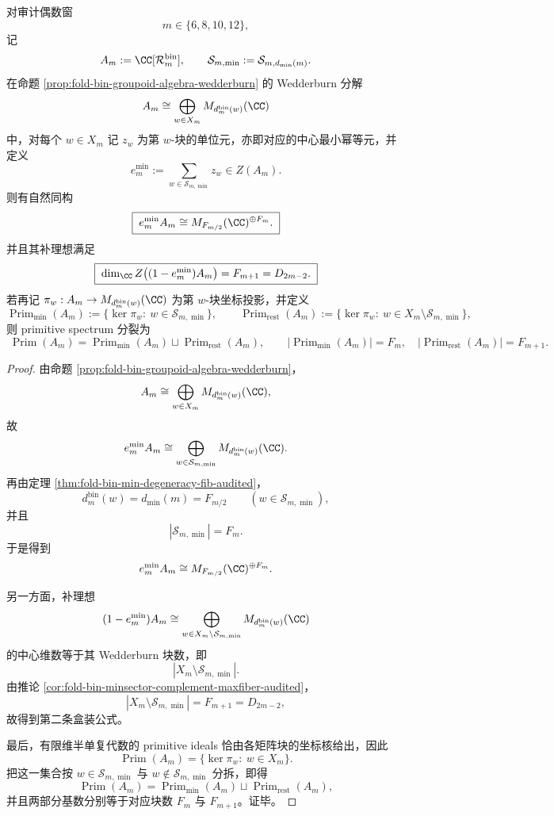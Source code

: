 \begin{theorem}\label{thm:conclusion-foldbin-minideal-fibonacci-primitive-splitting}
对审计偶数窗
\[
m\in\{6,8,10,12\},
\]
记
\[
A_m:=\CC[\mathcal R_m^{\mathrm{bin}}],
\qquad
\mathcal S_{m,\min}:=\mathcal S_{m,d_{\min}(m)}.
\]
在命题 \ref{prop:fold-bin-groupoid-algebra-wedderburn} 的 Wedderburn 分解
\[
A_m\cong \bigoplus_{w\in X_m}M_{d_m^{\mathrm{bin}}(w)}(\CC)
\]
中，对每个 \(w\in X_m\) 记 \(z_w\) 为第 \(w\)-块的单位元，亦即对应的中心最小幂等元，并定义
\[
e_m^{\min}:=\sum_{w\in\mathcal S_{m,\min}} z_w\in Z(A_m).
\]
则有自然同构
\[
\boxed{\;
e_m^{\min}A_m
\cong
M_{F_{m/2}}(\CC)^{\oplus F_m}.\;}
\]
并且其补理想满足
\[
\boxed{\;
\dim_{\CC}Z\bigl((1-e_m^{\min})A_m\bigr)
=
F_{m+1}
=
D_{2m-2}.\;}
\]
若再记 \(\pi_w:A_m\to M_{d_m^{\mathrm{bin}}(w)}(\CC)\) 为第 \(w\)-块坐标投影，并定义
\[
\operatorname{Prim}_{\min}(A_m):=\{\ker\pi_w:\ w\in\mathcal S_{m,\min}\},
\qquad
\operatorname{Prim}_{\mathrm{rest}}(A_m):=\{\ker\pi_w:\ w\in X_m\setminus\mathcal S_{m,\min}\},
\]
则 primitive spectrum 分裂为
\[
\boxed{\;
\operatorname{Prim}(A_m)
=
\operatorname{Prim}_{\min}(A_m)\sqcup \operatorname{Prim}_{\mathrm{rest}}(A_m),\qquad
|\operatorname{Prim}_{\min}(A_m)|=F_m,\quad
|\operatorname{Prim}_{\mathrm{rest}}(A_m)|=F_{m+1}.\;}
\]
\end{theorem}
\begin{proof}
由命题 \ref{prop:fold-bin-groupoid-algebra-wedderburn}，
\[
A_m\cong \bigoplus_{w\in X_m}M_{d_m^{\mathrm{bin}}(w)}(\CC),
\]
故
\[
e_m^{\min}A_m
\cong
\bigoplus_{w\in\mathcal S_{m,\min}}M_{d_m^{\mathrm{bin}}(w)}(\CC).
\]
再由定理 \ref{thm:fold-bin-min-degeneracy-fib-audited}，
\[
d_m^{\mathrm{bin}}(w)=d_{\min}(m)=F_{m/2}
\qquad (w\in\mathcal S_{m,\min}),
\]
并且
\[
|\mathcal S_{m,\min}|=F_m.
\]
于是得到
\[
e_m^{\min}A_m\cong M_{F_{m/2}}(\CC)^{\oplus F_m}.
\]

另一方面，补理想
\[
(1-e_m^{\min})A_m
\cong
\bigoplus_{w\in X_m\setminus\mathcal S_{m,\min}}M_{d_m^{\mathrm{bin}}(w)}(\CC)
\]
的中心维数等于其 Wedderburn 块数，即
\[
|X_m\setminus\mathcal S_{m,\min}|.
\]
由推论 \ref{cor:fold-bin-minsector-complement-maxfiber-audited}，
\[
|X_m\setminus\mathcal S_{m,\min}|=F_{m+1}=D_{2m-2},
\]
故得到第二条盒装公式。

最后，有限维半单复代数的 primitive ideals 恰由各矩阵块的坐标核给出，因此
\[
\operatorname{Prim}(A_m)=\{\ker\pi_w:\ w\in X_m\}.
\]
把这一集合按 \(w\in\mathcal S_{m,\min}\) 与 \(w\notin\mathcal S_{m,\min}\) 分拆，即得
\[
\operatorname{Prim}(A_m)=\operatorname{Prim}_{\min}(A_m)\sqcup \operatorname{Prim}_{\mathrm{rest}}(A_m),
\]
并且两部分基数分别等于对应块数 \(F_m\) 与 \(F_{m+1}\)。证毕。
\end{proof}

